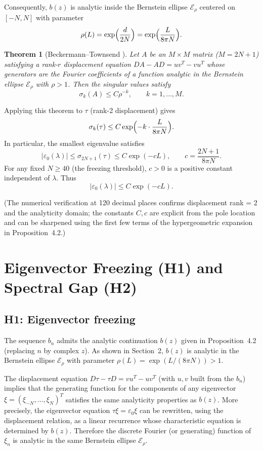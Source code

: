 \documentclass[11pt,a4paper]{article}
\newtheorem{theorem}{Theorem}[section]
\begin{document}
Consequently, \(b(z)\) is analytic inside the Bernstein ellipse \(\mathcal{E}_\rho\) centered on \([-N,N]\) with parameter
\[
\rho(L) = \exp\Bigl(\frac{d}{2N}\Bigr) = \exp\Bigl(\frac{L}{8\pi N}\Bigr).
\]

\begin{theorem}[Beckermann--Townsend \cite{BeckermannTownsend2019}]
Let \(A\) be an \(M\times M\) matrix (\(M=2N+1\)) satisfying a rank-\(r\) displacement equation \(DA - AD = uv^T - vu^T\) whose generators are the Fourier coefficients of a function analytic in the Bernstein ellipse \(\mathcal{E}_\rho\) with \(\rho>1\). Then the singular values satisfy
\[
\sigma_k(A) \leq C\rho^{-k},\qquad k=1,\dots,M.
\]
\end{theorem}

Applying this theorem to \(\tau\) (rank-2 displacement) gives
\[
\sigma_k(\tau) \leq C\exp\Bigl(-k\cdot\frac{L}{8\pi N}\Bigr).
\]
In particular, the smallest eigenvalue satisfies
\[
|\varepsilon_0(\lambda)| \leq \sigma_{2N+1}(\tau) \leq C\exp(-c L),\qquad c = \frac{2N+1}{8\pi N}.
\]
For any fixed \(N\geq40\) (the freezing threshold), \(c>0\) is a positive constant independent of \(\lambda\). Thus
\[
|\varepsilon_0(\lambda)| \leq C\exp(-c L).
\]

(The numerical verification at 120 decimal places confirms displacement rank = 2 and the analyticity domain; the constants \(C,c\) are explicit from the pole location and can be sharpened using the first few terms of the hypergeometric expansion in Proposition~4.2.)

\section{Eigenvector Freezing (H1) and Spectral Gap (H2)}

\subsection{H1: Eigenvector freezing}

The sequence \(b_n\) admits the analytic continuation \(b(z)\) given in Proposition~4.2 (replacing \(n\) by complex \(z\)). As shown in Section~2, \(b(z)\) is analytic in the Bernstein ellipse \(\mathcal{E}_\rho\) with parameter \(\rho(L)=\exp(L/(8\pi N))>1\).

The displacement equation \(D\tau - \tau D = vu^T - uv^T\) (with \(u,v\) built from the \(b_n\)) implies that the generating function for the components of any eigenvector \(\xi = (\xi_{-N},\dots,\xi_N)^T\) satisfies the same analyticity properties as \(b(z)\). More precisely, the eigenvector equation \(\tau\xi = \varepsilon_0\xi\) can be rewritten, using the displacement relation, as a linear recurrence whose characteristic equation is determined by \(b(z)\). Therefore the discrete Fourier (or generating) function of \(\xi_n\) is analytic in the same Bernstein ellipse \(\mathcal{E}_\rho\).
\end{document}
